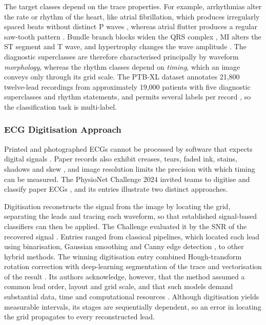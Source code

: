 \documentclass[12pt,nonacm,acmlarge,titlepage,screen]{acmart}
\begin{document}
The target classes depend on the trace properties. For example, arrhythmias alter the rate or rhythm of the heart, like atrial fibrillation, which produces irregularly spaced beats without distinct P waves \cite{van_gelder_2024_2024}, whereas atrial flutter produces a regular saw-tooth pattern \cite{cosio_atrial_2017}. Bundle branch blocks widen the QRS complex \cite{scherbak_left_2024}, MI alters the ST segment and T wave, and hypertrophy changes the wave amplitude \cite{channer_myocardial_2002}. The diagnostic superclasses are therefore characterised principally by waveform \emph{morphology}, whereas the rhythm classes depend on \emph{timing}, which an image conveys only through its grid scale. The PTB-XL dataset annotates 21,800 twelve-lead recordings from approximately 19,000 patients with five diagnostic superclasses and rhythm statements, and permits several labels per record \cite{wagner_ptbxl_2020}, so the classification task is multi-label.

\subsubsection{ECG Digitisation Approach}
\label{sec:digitisation}
\label{sec:ecg-imaging}
Printed and photographed ECGs cannot be processed by software that expects digital signals \cite{shivashankara_ecg-image-kit_2024}. Paper records also exhibit creases, tears, faded ink, stains, shadows and skew \cite{physionet_challenge_2024}, and image resolution limits the precision with which timing can be measured. The PhysioNet Challenge 2024 invited teams to digitise and classify paper ECGs \cite{physionet_challenge_2024}, and its entries illustrate two distinct approaches.


Digitisation reconstructs the signal from the image by locating the grid, separating the leads and tracing each waveform, so that established signal-based classifiers can then be applied. The Challenge evaluated it by the SNR of the recovered signal \cite{physionet_challenge_2024}. Entries ranged from classical pipelines, which located each lead using binarisation, Gaussian smoothing and Canny edge detection \cite{hempel_driving_2024}, to other hybrid methods. The winning digitisation entry combined Hough-transform rotation correction with deep-learning segmentation of the trace and vectorisation of the result \cite{krones_combining_2024}. Its authors acknowledge, however, that the method assumed a common lead order, layout and grid scale, and that such models demand substantial data, time and computational resources \cite{krones_combining_2024}. Although digitisation yields measurable intervals, its stages are sequentially dependent, so an error in locating the grid propagates to every reconstructed lead.
\end{document}
